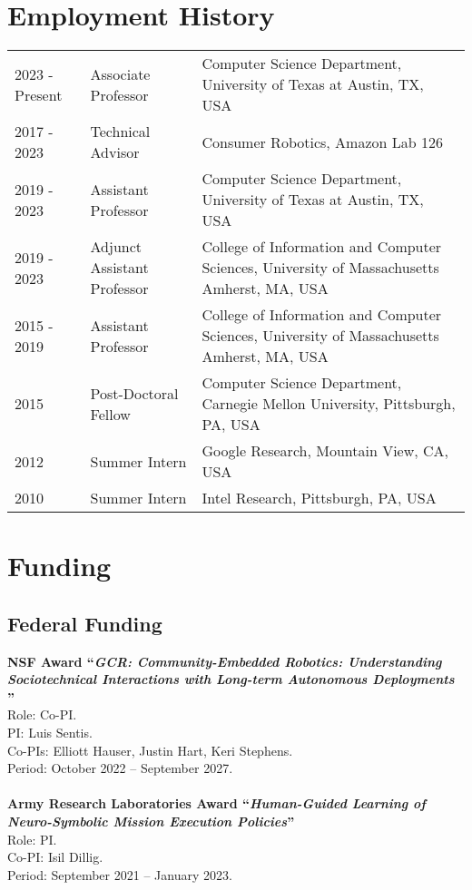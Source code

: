 \documentclass[Times]{article}
\newcommand{\funding}[1]{#1\\}
\renewcommand{\funding}[1]{\\}
\begin{document}

\section*{Employment History}
\begin{tabular}{ p{2cm} l p{8cm}}
  2023 - Present & Associate Professor & Computer Science Department,
  University of Texas at Austin, TX, USA \\
  2017 - 2023 & Technical Advisor &  Consumer Robotics, Amazon Lab 126\\
  2019 - 2023 & Assistant Professor & Computer Science Department,
  University of Texas at Austin, TX, USA \\
  2019 - 2023 & Adjunct Assistant Professor &  College of Information and Computer Sciences, University of Massachusetts Amherst, MA, USA\\
  2015 - 2019  & Assistant Professor &  College of Information and Computer Sciences, University of Massachusetts Amherst, MA, USA\\
  2015 & Post-Doctoral Fellow &  Computer Science Department, Carnegie Mellon University, Pittsburgh, PA, USA\\
  2012 & Summer Intern &  Google Research, Mountain View, CA, USA\\
  2010 & Summer Intern &  Intel Research, Pittsburgh, PA, USA\\
\end{tabular}


\section*{Funding}

\subsection*{Federal Funding}

\textbf{NSF Award ``\emph{GCR: Community-Embedded Robotics: Understanding Sociotechnical Interactions with Long-term Autonomous Deployments
}''}\\
Role: Co-PI.\\
PI: Luis Sentis.\\
Co-PIs: Elliott Hauser, Justin Hart, Keri Stephens.\\
Period: October 2022 -- September 2027.\\
\funding{Amount: \$3,600,000}

\textbf{Army Research Laboratories Award ``\emph{Human-Guided Learning of Neuro-Symbolic Mission Execution Policies}''}\\
Role: PI.\\
Co-PI: Isil Dillig.\\
Period: September 2021 -- January 2023.\\
\funding{Amount: \$372,798}
\end{document}
